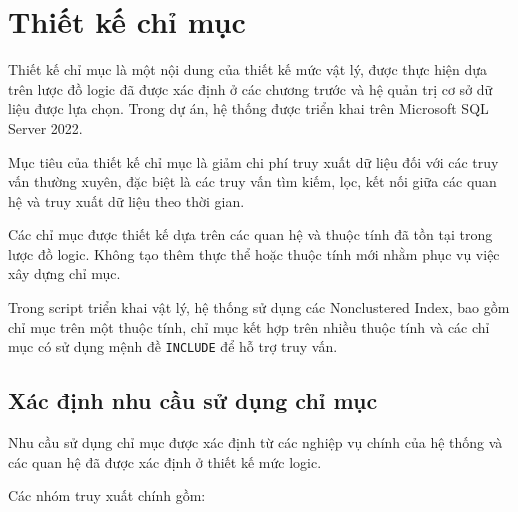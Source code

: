 \section{Thiết kế chỉ mục}

Thiết kế chỉ mục là một nội dung của thiết kế mức vật lý, được thực hiện
dựa trên lược đồ logic đã được xác định ở các chương trước và hệ quản trị cơ
sở dữ liệu được lựa chọn. Trong dự án, hệ thống được triển khai trên
Microsoft SQL Server 2022.

Mục tiêu của thiết kế chỉ mục là giảm chi phí truy xuất dữ liệu đối với các
truy vấn thường xuyên, đặc biệt là các truy vấn tìm kiếm, lọc, kết nối giữa
các quan hệ và truy xuất dữ liệu theo thời gian.

Các chỉ mục được thiết kế dựa trên các quan hệ và thuộc tính đã tồn tại
trong lược đồ logic. Không tạo thêm thực thể hoặc thuộc tính mới nhằm phục
vụ việc xây dựng chỉ mục.

Trong script triển khai vật lý, hệ thống sử dụng các Nonclustered Index,
bao gồm chỉ mục trên một thuộc tính, chỉ mục kết hợp trên nhiều thuộc tính
và các chỉ mục có sử dụng mệnh đề \texttt{INCLUDE} để hỗ trợ truy vấn.

\subsection{Xác định nhu cầu sử dụng chỉ mục}

Nhu cầu sử dụng chỉ mục được xác định từ các nghiệp vụ chính của hệ thống
và các quan hệ đã được xác định ở thiết kế mức logic.

Các nhóm truy xuất chính gồm:

